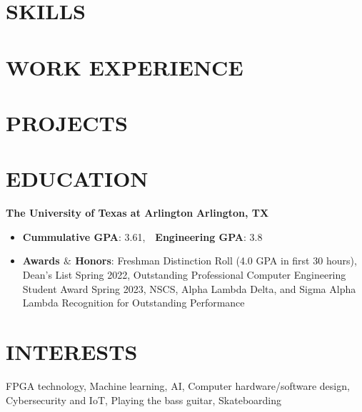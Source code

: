 \documentclass[10pt,letterpaper]{article}
\begin{document}


\section*{SKILLS}
    

\section*{WORK EXPERIENCE}



\section*{PROJECTS}

\vspace{0.3\baselineskip} %

\vspace{0.3\baselineskip} %

\vspace{0.3\baselineskip} %


\section*{EDUCATION} %
\textbf{The University of Texas at Arlington} \hfill \textbf{Arlington, TX}\\

\begin{itemize}
    \item \textbf{Cummulative GPA}: 3.61,\ \ \textbf{Engineering GPA}: 3.8

    \item \textbf{Awards $\&$ Honors}: Freshman Distinction Roll (4.0 GPA in first 30 hours), Dean's List Spring 2022, Outstanding Professional Computer Engineering Student Award Spring 2023, NSCS, Alpha Lambda Delta, and Sigma Alpha Lambda Recognition for Outstanding Performance
\end{itemize}

\section*{INTERESTS}
FPGA technology, Machine learning, AI, Computer hardware/software design, Cybersecurity and IoT, Playing the bass guitar, Skateboarding
\end{document}
